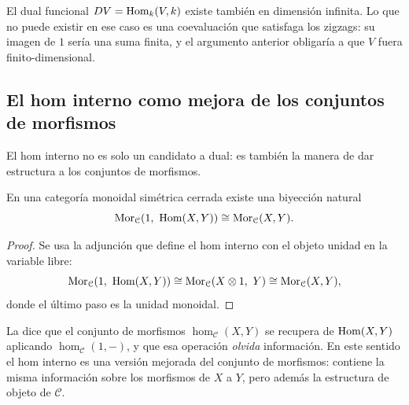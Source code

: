 
\begin{nota}
El dual funcional $DV=\operatorname{Hom}_k(V,k)$ existe también en dimensión infinita. Lo que no puede existir en ese caso es una coevaluación que satisfaga los zigzags: su imagen de $1$ sería una suma finita, y el argumento anterior obligaría a que $V$ fuera finito-dimensional.
\end{nota}


\subsection{El hom interno como mejora de los conjuntos de morfismos}

El hom interno no es solo un candidato a dual: es también la manera de dar estructura a los conjuntos de morfismos.

\begin{prop}\label{prop:hom-mor}
En una categoría monoidal simétrica cerrada existe una biyección natural
\[
\hom_{\mathcal C}(1,\ \ihom(X,Y))\cong\hom_{\mathcal C}(X,Y).
\]
\end{prop}
\begin{proof}
Se usa la adjunción que define el hom interno con el objeto unidad en la variable libre:
\[
\hom_{\mathcal C}(1,\ \ihom(X,Y))\cong\hom_{\mathcal C}(X\otimes1,\ Y)\cong\hom_{\mathcal C}(X,Y),
\]
donde el último paso es la unidad monoidal.
\end{proof}

La  dice que el conjunto de morfismos $\hom_{\mathcal C}(X,Y)$ se recupera de $\operatorname{Hom}(X,Y)$ aplicando $\hom_{\mathcal C}(1,-)$, y que esa operación \emph{olvida} información. En este sentido el hom interno es una versión mejorada del conjunto de morfismos: contiene la misma información sobre los morfismos de $X$ a $Y$, pero además la estructura de objeto de $\mathcal C$.

